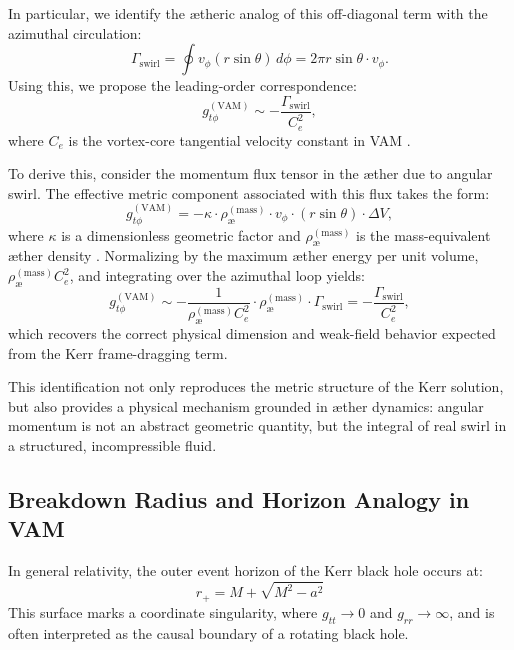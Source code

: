 \documentclass[twocolumn,aps,pre,floatfix,nofootinbib]{revtex4-2}
\begin{document}
    In particular, we identify the ætheric analog of this off-diagonal term with the azimuthal circulation:
    \begin{equation}
        \Gamma_{\text{swirl}} = \oint v_\phi (r \sin\theta) \, d\phi = 2\pi r \sin\theta \cdot v_\phi.
    \end{equation}
    Using this, we propose the leading-order correspondence:
    \begin{equation}
        g_{t\phi}^{(\text{VAM})} \sim -\frac{\Gamma_{\text{swirl}}}{C_e^2}, \label{eq:gtphi_vam}
    \end{equation}
    where $C_e$ is the vortex-core tangential velocity constant in VAM \cite{Iskandarani2025a}.

    To derive this, consider the momentum flux tensor in the æther due to angular swirl. The effective metric component associated with this flux takes the form:
    \begin{equation}
        g_{t\phi}^{(\text{VAM})} = - \kappa \cdot \rho_{\text{\ae}}^{(\text{mass})} \cdot v_\phi \cdot (r \sin\theta) \cdot \Delta V,
    \end{equation}
    where $\kappa$ is a dimensionless geometric factor and $\rho_{\text{\ae}}^{(\text{mass})}$ is the mass-equivalent æther density \cite{Iskandarani2025f}. Normalizing by the maximum æther energy per unit volume, $\rho_{\text{\ae}}^{(\text{mass})} C_e^2$, and integrating over the azimuthal loop yields:
    \begin{equation}
        g_{t\phi}^{(\text{VAM})} \sim -\frac{1}{\rho_{\text{\ae}}^{(\text{mass})} C_e^2} \cdot \rho_{\text{\ae}}^{(\text{mass})} \cdot \Gamma_{\text{swirl}} = -\frac{\Gamma_{\text{swirl}}}{C_e^2},
    \end{equation}
    which recovers the correct physical dimension and weak-field behavior expected from the Kerr frame-dragging term.

    This identification not only reproduces the metric structure of the Kerr solution, but also provides a physical mechanism grounded in æther dynamics: angular momentum is not an abstract geometric quantity, but the integral of real swirl in a structured, incompressible fluid.




    \subsection{Breakdown Radius and Horizon Analogy in VAM}

    In general relativity, the outer event horizon of the Kerr black hole occurs at:
    \[
        r_+ = M + \sqrt{M^2 - a^2}
    \]
    This surface marks a coordinate singularity, where \( g_{tt} \to 0 \) and \( g_{rr} \to \infty \), and is often interpreted as the causal boundary of a rotating black hole.
\end{document}
